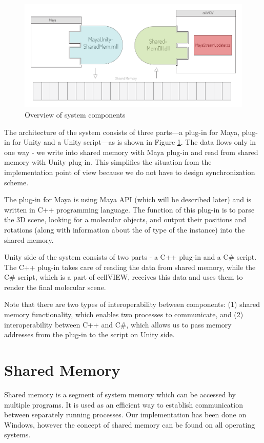 \documentclass[
  digital, %
  table,   %
  nolof,     %
  nolot,     %
]{fithesis3}
\begin{document}
\begin{figure}
  \begin{center}
    \includegraphics[scale=0.8]{images/system-overview.pdf}
  \end{center}
  \caption{Overview of system components}
  \label{fig:system-overview}
\end{figure}

The architecture of the system consists of three parts—a plug-in for Maya, plug-in for Unity and a Unity script—as is shown in Figure \ref{fig:system-overview}.
The data flows only in one way - we write into shared memory with Maya plug-in and read from shared memory with Unity plug-in. This simplifies the situation from the implementation point of view because we do not have to design synchronization scheme.

The plug-in for Maya is using Maya API (which will be described later) and is written in C++ programming language. The function of this plug-in is to parse the 3D scene, looking for a molecular objects, and output their positions and rotations (along with information about the of type of the instance) into the shared memory.

Unity side of the system consists of two parts - a C++ plug-in and a C\# script. The C++ plug-in takes care of reading the data from shared memory, while the C\# script, which is a part of cellVIEW, receives this data and uses them to render the final molecular scene.

Note that there are two types of interoperability between components: (1) shared memory functionality, which enables two processes to communicate, and (2) interoperability between C++ and C\#, which allows us to pass memory addresses from the plug-in to the script on Unity side.

\section{Shared Memory}
Shared memory is a segment of system memory which can be accessed by multiple programs. It is used as an efficient way to establish communication between separately running processes. Our implementation has been done on Windows, however the concept of shared memory can be found on all operating systems.
\end{document}
